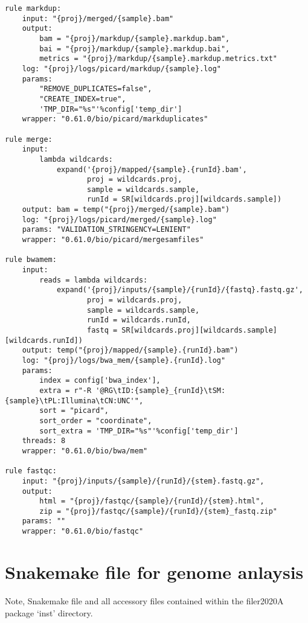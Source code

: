 \documentclass{article}\usepackage[]{graphicx}\usepackage[]{color}
\makeatletter
\newenvironment{kframe}{%
 \def\at@end@of@kframe{}%
 \ifinner\ifhmode%
  \def\at@end@of@kframe{\end{minipage}}%
  \begin{minipage}{\columnwidth}%
 \fi\fi%
 \def\FrameCommand##1{\hskip\@totalleftmargin \hskip-\fboxsep
 \colorbox{shadecolor}{##1}\hskip-\fboxsep
     \hskip-\linewidth \hskip-\@totalleftmargin \hskip\columnwidth}%
 \MakeFramed {\advance\hsize-\width
   \@totalleftmargin\z@ \linewidth\hsize
   \@setminipage}}%
 {\par\unskip\endMakeFramed%
 \at@end@of@kframe}
\newenvironment{knitrout}{}{} %
\makeatother
\begin{document}
\begin{knitrout}
\begin{kframe}
\begin{verbatim}
rule markdup:
    input: "{proj}/merged/{sample}.bam"
    output:
        bam = "{proj}/markdup/{sample}.markdup.bam",
        bai = "{proj}/markdup/{sample}.markdup.bai",
        metrics = "{proj}/markdup/{sample}.markdup.metrics.txt"
    log: "{proj}/logs/picard/markdup/{sample}.log"
    params:
        "REMOVE_DUPLICATES=false",
        "CREATE_INDEX=true",
        'TMP_DIR="%s"'%config['temp_dir']
    wrapper: "0.61.0/bio/picard/markduplicates"

rule merge:
    input:
        lambda wildcards: 
            expand('{proj}/mapped/{sample}.{runId}.bam', 
                   proj = wildcards.proj, 
                   sample = wildcards.sample, 
                   runId = SR[wildcards.proj][wildcards.sample])
    output: bam = temp("{proj}/merged/{sample}.bam")
    log: "{proj}/logs/picard/merged/{sample}.log"
    params: "VALIDATION_STRINGENCY=LENIENT"
    wrapper: "0.61.0/bio/picard/mergesamfiles"

rule bwamem:
    input:
        reads = lambda wildcards: 
            expand('{proj}/inputs/{sample}/{runId}/{fastq}.fastq.gz', 
                   proj = wildcards.proj, 
                   sample = wildcards.sample, 
                   runId = wildcards.runId, 
                   fastq = SR[wildcards.proj][wildcards.sample][wildcards.runId])
    output: temp("{proj}/mapped/{sample}.{runId}.bam")
    log: "{proj}/logs/bwa_mem/{sample}.{runId}.log"
    params:
        index = config['bwa_index'],
        extra = r"-R '@RG\tID:{sample}_{runId}\tSM:{sample}\tPL:Illumina\tCN:UNC'",
        sort = "picard",
        sort_order = "coordinate",
        sort_extra = 'TMP_DIR="%s"'%config['temp_dir']
    threads: 8
    wrapper: "0.61.0/bio/bwa/mem"

rule fastqc:
    input: "{proj}/inputs/{sample}/{runId}/{stem}.fastq.gz",
    output:
        html = "{proj}/fastqc/{sample}/{runId}/{stem}.html",
        zip = "{proj}/fastqc/{sample}/{runId}/{stem}_fastq.zip"
    params: ""
    wrapper: "0.61.0/bio/fastqc"
\end{verbatim}
\end{kframe}
\end{knitrout}

\section{Snakemake file for genome anlaysis}

Note, Snakemake file and all accessory files contained within the filer2020A package `inst' directory.
\end{document}
